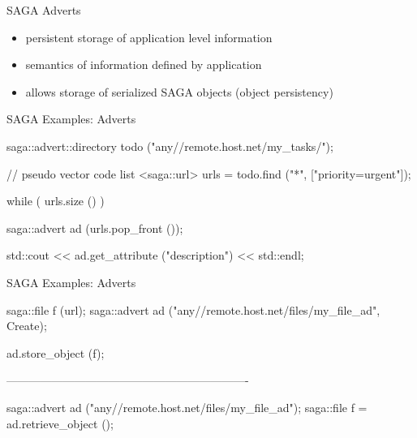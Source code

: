 \documentclass[%
  pdf,
  colorBG,
  slideColor,
  frames,
  ogf
]{prosper}
\newcommand{\dn}{\vspace*{+1em}}
\begin{document}

 \begin{slide}{SAGA Adverts}
 \dn
  \begin{itemize}
   \item persistent storage of application level information
   \item semantics of information defined by application
   \item allows storage of serialized SAGA objects (object persistency)
  \end{itemize}
 \end{slide}


 \begin{slide}{SAGA Examples: Adverts}

  \dn

  \begin{mycode}[label=Adverts]

  saga::advert::directory todo ("any//remote.host.net/my_tasks/");

  // pseudo vector code
  list <saga::url> urls = todo.find ("*", ["priority=urgent"]);

  while ( urls.size () )
  {
    saga::advert ad (urls.pop_front ());

    std::cout << ad.get_attribute ("description") << std::endl;
  }

  \end{mycode}
   
 \end{slide}


 \begin{slide}{SAGA Examples: Adverts}

  \dn

  \begin{mycode}[label=Persistent SAGA Objects]

  saga::file   f  (url);
  saga::advert ad ("any//remote.host.net/files/my_file_ad", Create);

  ad.store_object (f);

  ----------------------------------------------------------------

  saga::advert ad ("any//remote.host.net/files/my_file_ad");
  saga::file   f = ad.retrieve_object ();

  \end{mycode}
   
 \end{slide}
\end{document}

